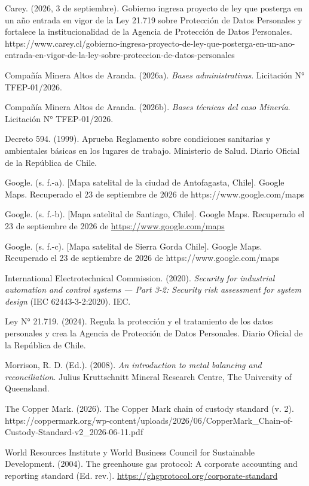 \documentclass[subdoc]{../../comun/overfore}
\begin{document}
\begin{referencias}
\item Carey. (2026, 3 de septiembre). Gobierno ingresa proyecto de ley que posterga en un año entrada en vigor de la Ley 21.719 sobre Protección de Datos Personales y fortalece la institucionalidad de la Agencia de Protección de Datos Personales. https://www.carey.cl/gobierno-ingresa-proyecto-de-ley-que-posterga-en-un-ano-entrada-en-vigor-de-la-ley-sobre-proteccion-de-datos-personales
\item Compañía Minera Altos de Aranda. (2026a). \emph{Bases administrativas}. Licitación N° TFEP-01/2026.
\item Compañía Minera Altos de Aranda. (2026b). \emph{Bases técnicas del caso Minería}. Licitación N° TFEP-01/2026.
\item Decreto 594. (1999). Aprueba Reglamento sobre condiciones sanitarias y ambientales básicas en los lugares de trabajo. Ministerio de Salud. Diario Oficial de la República de Chile.
\item Google. (s. f.-a). [Mapa satelital de la ciudad de Antofagasta, Chile]. Google Maps. Recuperado el 23 de septiembre de 2026 de https://www.google.com/maps
\item Google. (s. f.-b). [Mapa satelital de Santiago, Chile]. Google Maps. Recuperado el 23 de septiembre de 2026 de \href{https://www.google.com/maps}{https://www.google.com/maps}
\item Google. (s. f.-c). [Mapa satelital de Sierra Gorda Chile]. Google Maps. Recuperado el 23 de septiembre de 2026 de https://www.google.com/maps
\item International Electrotechnical Commission. (2020). \emph{Security for industrial automation and control systems — Part 3-2: Security risk assessment for system design} (IEC 62443-3-2:2020). IEC.
\item Ley N° 21.719. (2024). Regula la protección y el tratamiento de los datos personales y crea la Agencia de Protección de Datos Personales. Diario Oficial de la República de Chile.
\item Morrison, R. D. (Ed.). (2008). \emph{An introduction to metal balancing and reconciliation}. Julius Kruttschnitt Mineral Research Centre, The University of Queensland.
\item The Copper Mark. (2026). The Copper Mark chain of custody standard (v. 2). https://coppermark.org/wp-content/uploads/2026/06/CopperMark\_Chain-of-Custody-Standard-v2\_2026-06-11.pdf
\item World Resources Institute y World Business Council for Sustainable Development. (2004). The greenhouse gas protocol: A corporate accounting and reporting standard (Ed. rev.). \href{https://ghgprotocol.org/corporate-standard}{https://ghgprotocol.org/corporate-standard}
\end{referencias}
\end{document}
